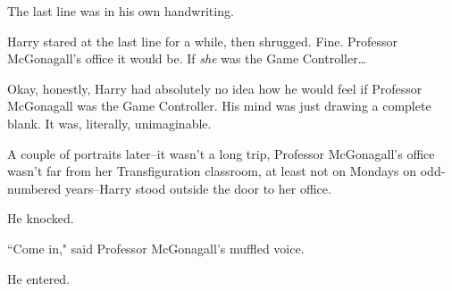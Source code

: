 The last line was in his own handwriting.

Harry stared at the last line for a while, then shrugged. Fine. Professor McGonagall's office it would be. If \emph{she} was the Game Controller{\ldots}

Okay, honestly, Harry had absolutely no idea how he would feel if Professor McGonagall was the Game Controller. His mind was just drawing a complete blank. It was, literally, unimaginable.

A couple of portraits later\---it wasn't a long trip, Professor McGonagall's office wasn't far from her Transfiguration classroom, at least not on Mondays on odd-numbered years\---Harry stood outside the door to her office.

He knocked.

``Come in," said Professor McGonagall's muffled voice.

He entered.

